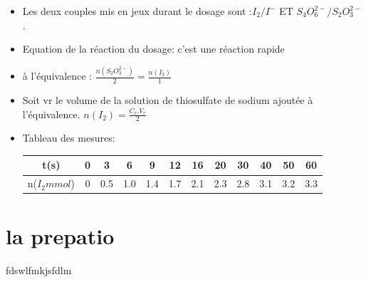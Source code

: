 \documentclass[12pt]{article}
\begin{document}
\begin{itemize}
\item Les deux couples mis en jeux durant le dosage sont :$I_2/I^-$ ET $S_4O_6^{2-}/S_2O_3^{2-}$.
\item Equation de la réaction du dosage: 
c'est une réaction rapide 
\item à l'équivalence : $\frac{n(S_2O_3^{2-})}{2} = \frac{n(I_2)}{1}$

\item Soit vr le volume de la solution de thiosulfate de sodium ajoutée à l'équivalence. $n(I_2) = \frac{C_r.V_r}{2}$

\item Tableau des mesures: 

\begin{center}
   \begin{tabular}{|c|c|c|c|c|c|c|c|c|c|c|c|}
	  \hline
	  t(s)         &0&3  &6&9&12&16&20&30&40&50&60 \\\hline
	  n($I_2 mmol$)&0&0.5&1.0 &1.4&1.7&2.1&2.3&2.8&3.1&3.2&3.3\\\hline
   \end{tabular}
\end{center}






\end{itemize}
\section{la prepatio}
fdswlfmkjsfdlm
\end{document}
